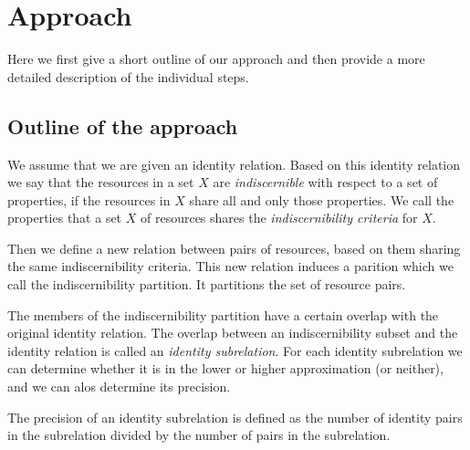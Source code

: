 \section{Approach}
\label{sec:approach}

Here we first give a short outline of our approach and then
  provide a more detailed description of the individual steps.

\subsection{Outline of the approach}

We assume that we are given an identity relation.
Based on this identity relation we say that
  the resources in a set $X$ are \emph{indiscernible}
  with respect to a set of properties,
  if the resources in $X$ share all and only those properties.
We call the properties that a set $X$ of resources shares
  the \emph{indiscernibility criteria} for $X$.

Then we define a new relation between pairs of resources,
  based on them sharing the same indiscernibility criteria.
This new relation induces a parition which we call
  the indiscernibility partition.
It partitions the set of resource pairs.

The members of the indiscernibility partition
  have a certain overlap with the original identity relation.
The overlap between an indiscernibility subset and the identity relation
  is called an \emph{identity subrelation}.
For each identity subrelation we can determine whether it is in
  the lower or higher approximation (or neither),
  and we can alos determine its precision.

The precision of an identity subrelation is defined as
    the number of identity pairs in the subrelation
  divided by
    the number of pairs in the subrelation.





